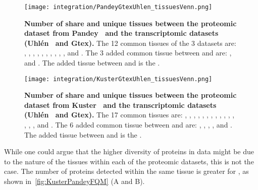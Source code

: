 \begin{figure}[!htbp]
    \texttt{[image: integration/PandeyGtexUhlen\_tissuesVenn.png]}
    \centering
    \caption[Number of share and unique tissues between the proteomic
    dataset from Pandey \etal\ and the transcriptomic datasets (Uhlén \etal\ and
    Gtex)]{\label{fig:VennTissuePandeyGtexUhlen}\textbf{Number of share and unique
    tissues between the proteomic dataset from Pandey \etal\ and the
    transcriptomic datasets (Uhlén \etal\ and Gtex).} The 12 common tissues of
    the 3 datasets are:
    , , , ,
    , , , , ,
    ,  and . The 3 added common
    tissue between  and  are:
    ,  and . The added tissue
    between  and  is the .}
\end{figure}

\begin{figure}[!htbp]
    \texttt{[image: integration/KusterGtexUhlen\_tissuesVenn.png]}
    \centering
    \caption[Number of share and unique tissues between the proteomic dataset
    from Kuster \etal\ and the transcriptomic datasets (Uhlén \etal\ and
    Gtex)]{\label{fig:VennTissueKusterGtexUhlen}\textbf{Number of share and unique
    tissues between the proteomic dataset from Kuster \etal\ and the
    transcriptomic datasets (Uhlén \etal\ and Gtex).} The 17 common tissues are:
    , , ,  ,
    , , , ,
    , , , ,
    , , ,  and
    . The 6 added common tissue between  and
     are: , ,
    , ,  and .
    The added tissue between  and  is the
    .}
\end{figure}

While one could argue that the higher diversity of proteins in
 data might be due to the nature of the tissues within
each of the proteomic datasets, this is not the case. The number of proteins
detected within the same tissue is greater for  ,
as shown in~\cref{fig:KusterPandeyFQM} (A and B).

